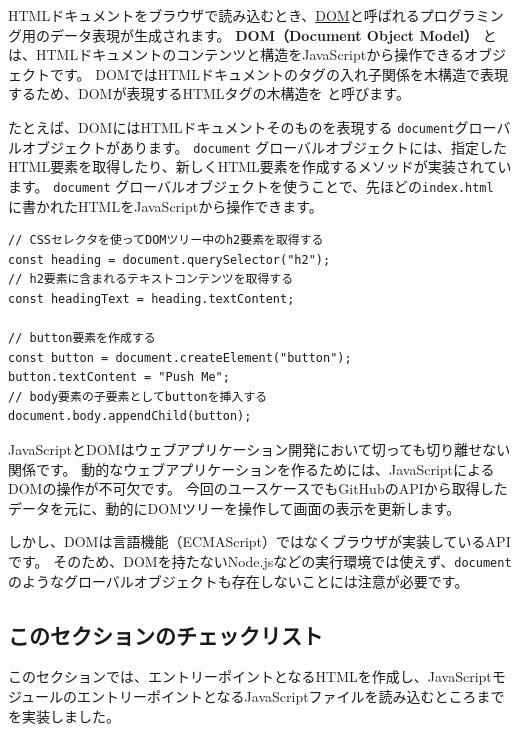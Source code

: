 HTMLドキュメントをブラウザで読み込むとき、\href{https://developer.mozilla.org/ja/docs/Web/API/Document_Object_Model/Introduction}{DOM}と呼ばれるプログラミング用のデータ表現が生成されます。
\textbf{DOM（Document Object Model）}
とは、HTMLドキュメントのコンテンツと構造をJavaScriptから操作できるオブジェクトです。
DOMではHTMLドキュメントのタグの入れ子関係を木構造で表現するため、DOMが表現するHTMLタグの木構造を
\textbf{}と呼びます。

たとえば、DOMにはHTMLドキュメントそのものを表現する
\texttt{document}グローバルオブジェクトがあります。
\texttt{document}
グローバルオブジェクトには、指定したHTML要素を取得したり、新しくHTML要素を作成するメソッドが実装されています。
\texttt{document}
グローバルオブジェクトを使うことで、先ほどの\texttt{index.html}
に書かれたHTMLをJavaScriptから操作できます。

\begin{lstlisting}
// CSSセレクタを使ってDOMツリー中のh2要素を取得する
const heading = document.querySelector("h2");
// h2要素に含まれるテキストコンテンツを取得する
const headingText = heading.textContent;

// button要素を作成する
const button = document.createElement("button");
button.textContent = "Push Me";
// body要素の子要素としてbuttonを挿入する
document.body.appendChild(button);
\end{lstlisting}

JavaScriptとDOMはウェブアプリケーション開発において切っても切り離せない関係です。
動的なウェブアプリケーションを作るためには、JavaScriptによるDOMの操作が不可欠です。
今回のユースケースでもGitHubのAPIから取得したデータを元に、動的にDOMツリーを操作して画面の表示を更新します。

しかし、DOMは言語機能（ECMAScript）ではなくブラウザが実装しているAPIです。
そのため、DOMを持たないNode.jsなどの実行環境では使えず、\texttt{document}のようなグローバルオブジェクトも存在しないことには注意が必要です。

\hypertarget{section-checklist}{%
\subsection{このセクションのチェックリスト}\label{section-checklist}}

このセクションでは、エントリーポイントとなるHTMLを作成し、JavaScriptモジュールのエントリーポイントとなるJavaScriptファイルを読み込むところまでを実装しました。

